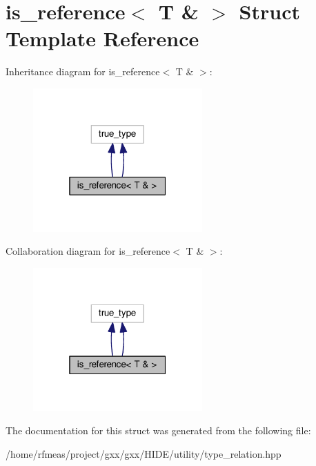 \hypertarget{structis__reference_3_01T_01_6_01_4}{}\section{is\+\_\+reference$<$ T \& $>$ Struct Template Reference}
\label{structis__reference_3_01T_01_6_01_4}


Inheritance diagram for is\+\_\+reference$<$ T \& $>$\+:
\nopagebreak
\begin{figure}[H]
\begin{center}
\leavevmode
\includegraphics[width=184pt]{structis__reference_3_01T_01_6_01_4__inherit__graph}
\end{center}
\end{figure}


Collaboration diagram for is\+\_\+reference$<$ T \& $>$\+:
\nopagebreak
\begin{figure}[H]
\begin{center}
\leavevmode
\includegraphics[width=184pt]{structis__reference_3_01T_01_6_01_4__coll__graph}
\end{center}
\end{figure}


The documentation for this struct was generated from the following file\+:\begin{DoxyCompactItemize}
\item 
/home/rfmeas/project/gxx/gxx/\+H\+I\+D\+E/utility/type\+\_\+relation.\+hpp\end{DoxyCompactItemize}
